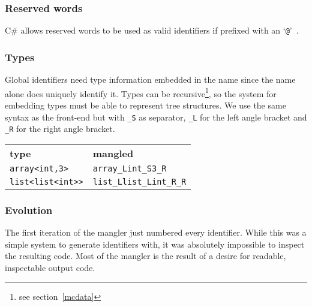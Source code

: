 
\subsubsection{Reserved words}
C\# allows reserved words to be used as valid identifiers if prefixed with an `\verb|@|'~\cite{msdn_identifiers}.

\subsubsection{Types}
Global identifiers need type information embedded in the name since the name alone does uniquely identify it.
Types can be recursive\footnote{see section~\ref{mcdata}}, so the system for embedding types must be able to represent tree structures.
We use the same syntax as the front-end but with \verb|_S| as separator, \verb|_L| for the left angle bracket and \verb|_R| for the right angle bracket.

{\footnotesize
\begin{tabular}{ll}
\textbf{\normalsize type}          & \textbf{\normalsize mangled} \\
\verb|array<int,3>|    & \verb|array_Lint_S3_R| \\
\verb|list<list<int>>| & \verb|list_Llist_Lint_R_R| \\
\end{tabular}
}

\subsubsection{Evolution}
The first iteration of the mangler just numbered every identifier.
While this was a simple system to generate identifiers with, it was absolutely impossible to inspect the resulting code.
Most of the mangler is the result of a desire for readable, inspectable output code.

